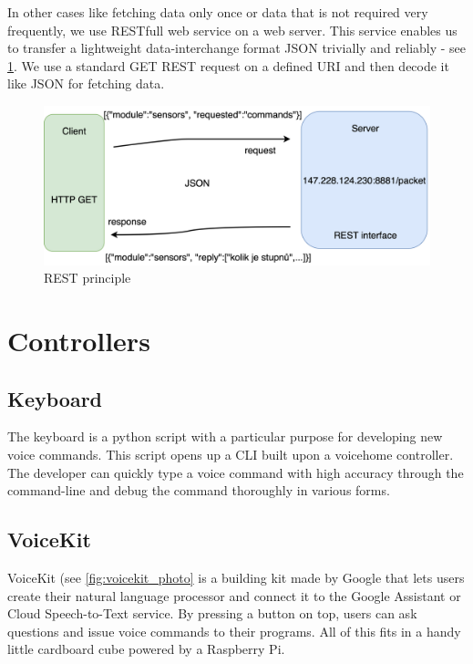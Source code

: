 In other cases like fetching data only once or data that is not required very frequently, we use RESTfull web service on a web server. This service enables us to transfer a lightweight data-interchange format JSON trivially and reliably - see \cref{fig:REST_schema}. We use a standard GET REST request on a defined URI and then decode it like JSON for fetching data.

\begin{figure}[H]
  \centering
  \includegraphics[width=\textwidth]{img/REST_schema.png}
  \caption{REST principle}
  \label{fig:REST_schema}
\end{figure}

\section{Controllers}

\subsection{Keyboard}

The keyboard is a python script with a particular purpose for developing new voice commands. This script opens up a CLI built upon a voicehome controller. The developer can quickly type a voice command with high accuracy through the command-line and debug the command thoroughly in various forms.

\subsection{VoiceKit}

VoiceKit (see \cref{fig:voicekit_photo} is a building kit made by Google \citep{aiy_projects} that lets users create their natural language processor and connect it to the Google Assistant or Cloud Speech-to-Text service. By pressing a button on top, users can ask questions and issue voice commands to their programs. All of this fits in a handy little cardboard cube powered by a Raspberry Pi.

